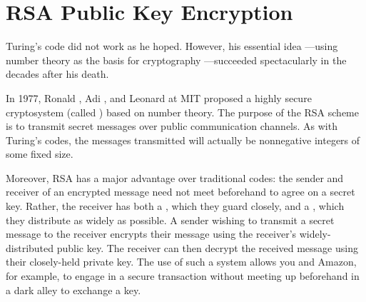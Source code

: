 \begin{problems}
\practiceproblems
{}

\classproblems
{}

\homeworkproblems
{}

\examproblems
{}

\end{problems}

\section{RSA Public Key Encryption}\label{RSA_sec}

Turing's code did not work as he hoped.  However, his essential idea
---using number theory as the basis for cryptography ---succeeded
spectacularly in the decades after his death.

In 1977, Ronald , Adi , and Leonard
 at MIT proposed a highly secure cryptosystem (called
\textbf{}) based on number theory.  The purpose of the RSA
scheme is to transmit secret messages over public communication
channels.  As with Turing's codes, the messages transmitted will
actually be nonnegative integers of some fixed size.

Moreover, RSA has a major advantage over traditional codes:
the sender and receiver of an encrypted message need not meet beforehand
to agree on a secret key.  Rather, the receiver has both a
, which they guard closely, and a ,
which they distribute as widely as possible.  A sender wishing to
transmit a secret message to the receiver encrypts their message using
the receiver's widely-distributed public key.  The receiver can then
decrypt the received message using their closely-held private key.
The use of such a  system allows you and
Amazon, for example, to engage in a secure transaction without meeting
up beforehand in a dark alley to exchange a key.


